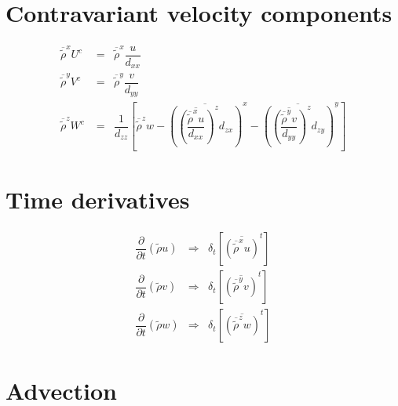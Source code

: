 \section{Contravariant velocity components}

\begin{eqnarray}
\overline{\tilde{\rho}}^{x} U^{c} \;  &  = & \overline{\tilde{\rho}}^{x} \dfrac{ u }{ d_{xx}} \\
\overline{\tilde{\rho}}^{y} V^{c} \;  &  = & \overline{\tilde{\rho}}^{y} \dfrac{ v }{ d_{yy}} \\
\overline{\tilde{\rho}}^{z} W^{c} \;  & = & \dfrac{1}{d_{zz}}
\left[\overline{\tilde{\rho}}^{z}  w -
\overline{\left( \overline{\left(
 \dfrac{\overline{\tilde{\rho}}^{x}  u }{d_{xx}} \right)}^{z}
d_{zx}\right)}^{x}
-  \overline{\left( \overline{\left(\dfrac{\overline{\tilde{\rho}}^{y}  v }{d_{yy}}
\right)}^{z}
d_{zy}\right)}^{y}\right]
\end{eqnarray}

\section{Time derivatives}

\begin{eqnarray}
\dfrac{\partial}{\partial t}(\tilde{\rho}  u ) & \Longrightarrow &
\delta _{t } \left[ \overline{ \left( \overline{\tilde{\rho}}^{x}  u
 \right)}^{t} \right]
 \\
\dfrac{\partial}{\partial t}(\tilde{\rho}  v ) & \Longrightarrow &
\delta _{t } \left[  \overline{ \left( \overline{ \tilde{\rho}}^{y}  v
 \right)}^{t}  \right]
 \\
  \dfrac{\partial}{\partial t}(\tilde{\rho} w) & \Longrightarrow &
\delta_{t } \left[
\overline{ \left( \overline{\tilde{\rho}}^{z} w  \right)}^{t} \right]
\end{eqnarray}

\section{Advection}

